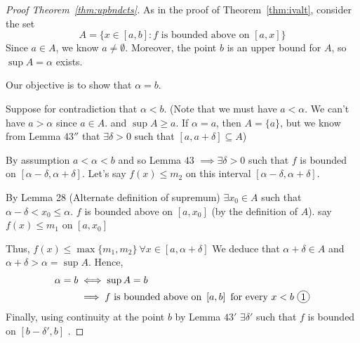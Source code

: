 \begin{proof}[Proof Theorem~\ref{thm:upbndcts}]
    As in the proof of Theorem~\ref{thm:ivalt}, consider the set
    $$A = \{ x \in \left[a, b\right] : f \text{ is bounded above on }\left[a, x\right]\}$$
    Since $a \in A$, we know $a \neq \emptyset$.
    Moreover, the point $b$ is an upper bound for $A$, so $\sup A = \alpha$ exists.

    Our objective is to show that $\alpha = b$.

    Suppose for contradiction that $\alpha < b$.
    (Note that we must have $a < \alpha$.
    We can't have $a > \alpha$ since $a \in A$. and $\sup A \geq a$.
    If $\alpha = a$, then $A = \{a\}$, but we know from Lemma $43''$ that
    $\exists \delta > 0$ such that $\left[a, a+\delta\right] \subseteq A$)

    By assumption $a < \alpha < b$ and so Lemma $43$ $\implies \exists\delta > 0$ such that
    $f$ is bounded on $\left[\alpha - \delta, \alpha + \delta\right]$.
    Let's say $f(x) \leq m_2$ on this interval $\left[\alpha - \delta, \alpha + \delta\right]$.

    By Lemma 28 (Alternate definition of supremum)
    $\exists x_0 \in A$ such that $\alpha - \delta < x_0 \leq \alpha$.
    $f$ is bounded above on $\left[a, x_0\right]$ (by the definition of $A$).
    say $f(x) \leq m_1$ on $\left[a, x_0\right]$
    \begin{center}
    \end{center}
    Thus, $f(x) \leq \max\{m_1, m_2\}\ \forall x \in \left[a, \alpha+\delta\right]$
    We deduce that $\alpha + \delta \in A$ and $\alpha + \delta > \alpha = \sup A$.
    Hence, 
    \begin{align*}
        \alpha = b &\iff \sup A = b \\
        &\implies f \text{ is bounded above on }\left[a, b\right] \text{ for every } x < b \text{ \circled{1}}
    \end{align*}
    Finally, using continuity at the point $b$ by Lemma $43'$ $\exists \delta'$ such that
    $f$ is bounded on $\left[b-\delta', b\right]$ .


\end{proof}
